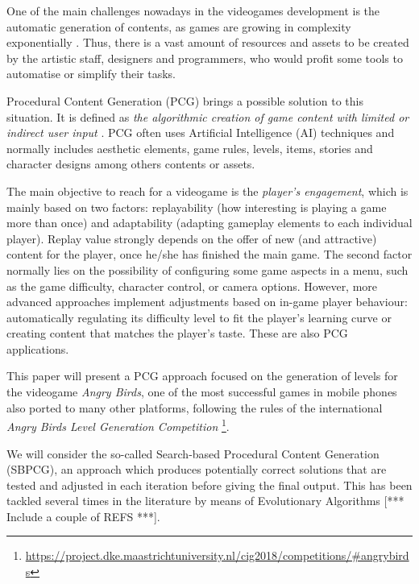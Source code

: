 \documentclass[runningheads,a4paper]{llncs}
\begin{document}
One of the main challenges nowadays in the videogames development is the automatic generation of contents, as games are growing in complexity exponentially \cite{togelius2016introduction}. Thus, there is a vast amount of resources and assets to be created by the artistic staff, designers and programmers, who would profit some tools to automatise or simplify their tasks.

Procedural Content Generation (PCG) brings a possible solution to this situation. It is defined as \textit{the algorithmic creation of game content with limited or indirect user input} \cite{togelius2011procedural}. 
PCG often uses Artificial Intelligence (AI) techniques and normally includes aesthetic elements, game rules, levels, items, stories and character designs among others contents or assets.

The main objective to reach for a videogame is the \textit{player's engagement}, which is mainly based on two factors: replayability (how interesting is playing a game more than once) and adaptability (adapting gameplay elements to each individual player). Replay value strongly depends on the offer of new (and attractive) content for the player, once he/she has finished the main game. The second factor normally lies on the possibility of configuring some game aspects in a menu, such as the game difficulty, character control, or camera options. However, more advanced approaches implement adjustments based on in-game player behaviour: automatically regulating its difficulty level to fit the player's learning curve or creating content that matches the player's taste.
These are also PCG applications.


This paper will present a PCG approach focused on the generation of levels for the videogame \textit{Angry Birds}\cite{angry-birds}, one of the most successful games in mobile phones also ported to many other platforms, following the rules of the international \textit{Angry Birds Level Generation Competition} \footnote{\url{https://project.dke.maastrichtuniversity.nl/cig2018/competitions/#angrybirds}}.

We will consider the so-called Search-based Procedural Content Generation (SBPCG), an approach which produces potentially correct solutions that are tested and adjusted in each iteration before giving the final output. This has been tackled several times in the literature by means of Evolutionary Algorithms [*** Include a couple of REFS ***].
\end{document}
